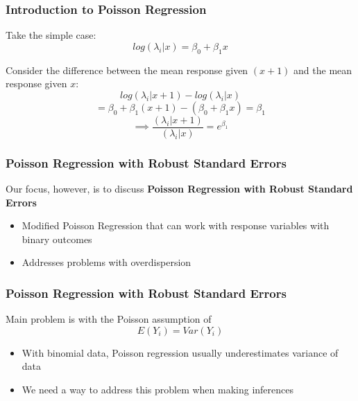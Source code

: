 \documentclass{beamer}
\begin{document}
\begin{frame}[fragile]\frametitle{Introduction to Poisson Regression}	
	
	Take the simple case: $$ log(\lambda_i|x) = \beta_0 + \beta_1 x $$

	Consider the difference between the mean response given $(x+1)$ and the mean response given $x$: 
			  $$ log(\lambda_i|x+1) - log(\lambda_i|x) $$
			  $$ = \beta_0 + \beta_1 (x + 1) - (\beta_0 + \beta_1 x) = \beta_1 $$
			  $$ \implies \frac{(\lambda_i|x+1)}{(\lambda_i|x)} = e^{\beta_1} $$
	
\end{frame}



\begin{frame}[fragile]\frametitle{Poisson Regression with Robust Standard Errors}
	
	Our focus, however, is to discuss \textbf{Poisson Regression with Robust Standard Errors}

	\begin{itemize}
	
		\item Modified Poisson Regression that can work with response variables with binary outcomes
		
		\item Addresses problems with overdispersion

	\end{itemize}
	
\end{frame}



\begin{frame}[fragile]\frametitle{Poisson Regression with Robust Standard Errors}

	Main problem is with the Poisson assumption of 	
	$$ E(Y_i) = Var(Y_i) $$ 

	\begin{itemize}

		\item With binomial data, Poisson regression usually underestimates variance of data
		
		\item We need a way to address this problem when making inferences

	\end{itemize}
	
\end{frame}
\end{document}
